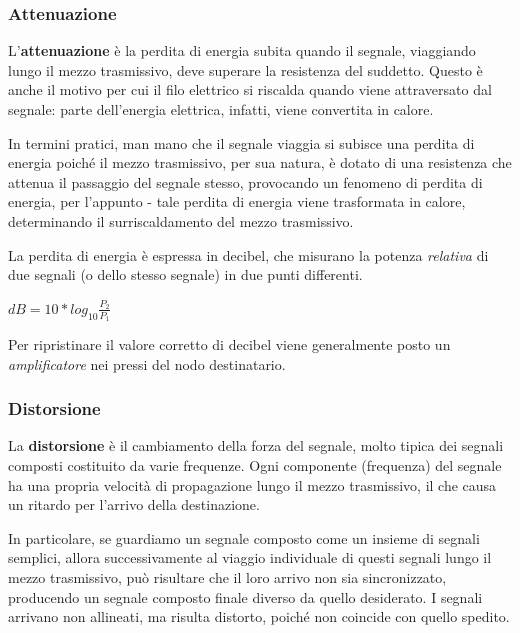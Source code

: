         \subsubsection{Attenuazione}
        
            L'\textbf{attenuazione} è la perdita di energia subita quando il segnale, viaggiando lungo il mezzo trasmissivo, deve superare la resistenza del suddetto. Questo è anche il motivo per cui il filo elettrico si riscalda quando viene attraversato dal segnale: parte dell'energia elettrica, infatti, viene convertita in calore. 
            
            In termini pratici, man mano che il segnale viaggia si subisce una perdita di energia poiché il mezzo trasmissivo, per sua natura, è dotato di una resistenza che attenua il passaggio del segnale stesso, provocando un fenomeno di perdita di energia, per l'appunto - tale perdita di energia viene trasformata in calore, determinando il surriscaldamento del mezzo trasmissivo.
            
            La perdita di energia è espressa in decibel, che misurano la potenza \textit{relativa} di due segnali (o dello stesso segnale) in due punti differenti. 
            
            \(dB = 10*log_10 \frac{P_2}{P_1}\)
            
            Per ripristinare il valore corretto di decibel viene generalmente posto un \textit{amplificatore} nei pressi del nodo destinatario.
        
        \subsubsection{Distorsione}
        
            La \textbf{distorsione} è il cambiamento della forza del segnale, molto tipica dei segnali composti costituito da varie frequenze. Ogni componente (frequenza) del segnale ha una propria velocità di propagazione lungo il mezzo trasmissivo, il che causa un ritardo per l'arrivo della destinazione.
            
            In particolare, se guardiamo un segnale composto come un insieme di segnali semplici, allora successivamente al viaggio individuale di questi segnali lungo il mezzo trasmissivo, può risultare che il loro arrivo non sia sincronizzato, producendo un segnale composto finale diverso da quello desiderato. I segnali arrivano non allineati, ma risulta distorto, poiché non coincide con quello spedito.
        
